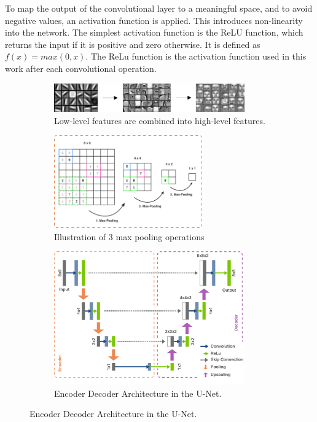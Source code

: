 To map the output of the convolutional layer to a meaningful space, and to avoid negative values, an activation function is applied. This introduces non-linearity into the network. The simplest activation function is the ReLU function, which returns the input if it is positive and zero otherwise. It is defined as $f(x) = max(0, x)$. The ReLu function is the activation function used in this work after each convolutional operation.

\begin{figure}[H]
    \begin{subfigure}{1\textwidth}
        \centering
        \includegraphics[width=0.9\textwidth]{resources/images/abstraction.png}
        \caption{Low-level features are combined into high-level features.}
        \label{fig: abstraction}
    \end{subfigure}
    \begin{subfigure}{\textwidth}
        \centering
        \vspace{0.5cm}
        \includegraphics[width=0.7\textwidth]{resources/images/max_pooling.png}
        \caption{Illustration of 3 max pooling operations}
        \label{fig: max_pooling}
    \end{subfigure}
    \begin{subfigure}{\textwidth}
        \centering
        \vspace{0.5cm}
        \includegraphics[width=0.9\textwidth]{resources/images/u_net.png}
        \caption{Encoder Decoder Architecture in the U-Net.}
        \label{fig: u_net}
    \end{subfigure}
\end{figure}

